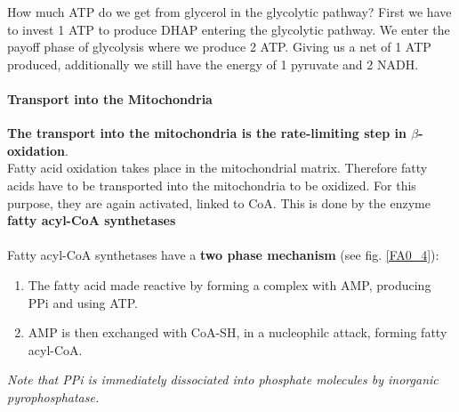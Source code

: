 \documentclass[../main.tex]{subfiles}
\begin{document}
\begin{RemarkWithTitel}{How much ATP do we get from glycerol in the glycolytic pathway?}
	First we have to invest 1 ATP to produce DHAP entering the glycolytic pathway. We enter the payoff phase of glycolysis where we produce 2 ATP. Giving us a net of 1 ATP produced, additionally we still have the energy of 1 pyruvate and 2 NADH. 
\end{RemarkWithTitel}

\paragraph{Transport into the Mitochondria}
\textbf{The transport into the mitochondria is the rate-limiting step in $\beta$-oxidation}.\\
Fatty acid oxidation takes place in the mitochondrial matrix. Therefore fatty acids have to be transported into the mitochondria to be oxidized. For this purpose, they are again activated, linked to CoA. This is done by the enzyme \textbf{fatty acyl-CoA synthetases}\\
\\
Fatty acyl-CoA synthetases have a \textbf{two phase mechanism} (see fig. \ref{FA0_4}): 
\begin{enumerate}
	\item The fatty acid made reactive by forming a complex with AMP, producing PPi and using ATP. 
	\item AMP is then exchanged with CoA-SH, in a nucleophilc attack, forming fatty acyl-CoA. 
\end{enumerate}
\noindent \textit{Note that PPi is immediately dissociated into phosphate molecules by inorganic pyrophosphatase. } 
\end{document}
